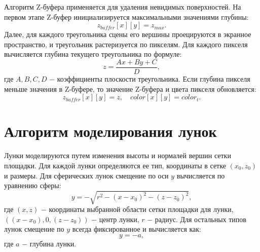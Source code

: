 Алгоритм Z-буфера применяется для удаления невидимых поверхностей. На первом этапе Z-буфер инициализируется максимальными значениями глубины:
\begin{equation}
    \label{for}
    z_{buffer}[x][y] = z_{max}.
\end{equation}
Далее, для каждого треугольника сцены его вершины проецируются в экранное пространство, и треугольник растеризуется по пикселям. Для каждого пикселя вычисляется глубина текущего треугольника по формуле:
\begin{equation}
    \label{for}
    z = \frac{Ax + By + C}{D},
\end{equation}
где $A, B, C, D$ $-$ коэффициенты плоскости треугольника. Если глубина пикселя меньше значения в Z-буфере, то значение Z-буфера и цвета пикселя обновляется:
\begin{equation}
    \label{for}
    z_{buffer}[x][y] = z, \quad color[x][y] = color_{t}.
\end{equation}

\section{Алгоритм моделирования лунок}

Лунки моделируются путем изменения высоты и нормалей вершин сетки площадки. Для каждой лунки определяются ее тип, координаты в сетке $(x_0, z_0)$ и размеры. Для сферических лунок смещение по оси $y$ вычисляется по уравнению сферы:
\begin{equation}
    \label{for}
    y = -\sqrt{r^2 - (x - x_0)^2 - (z - z_0)^2},
\end{equation}
где $(x, z)$ $-$ координаты выбранной области сетки площадки для лунки, $((x-x_0), 0, (z-z_0))$ $-$ центр лунки, $r$ $-$ радиус. Для остальных типов лунок смещение по $y$ всегда фиксированное и вычисляется как:
\begin{equation}
    \label{for}
    y = -a,
\end{equation}
где $a$ $-$ глубина лунки.

